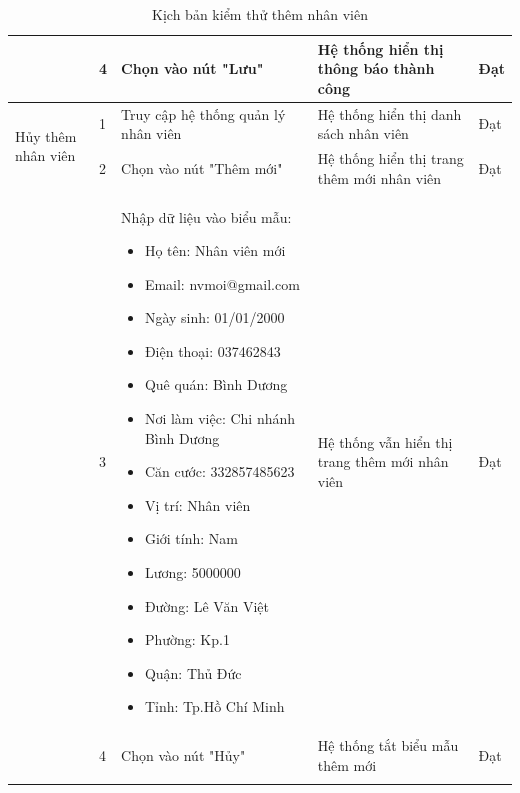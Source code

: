 {\begin{longtable}{| p{2.5cm}| p{1cm}| p{5.5cm}| p{4.5cm} | p{1.5cm} |}
        \cline{2-5}
                                                   & 4                                              & Chọn vào nút "Lưu"                  & Hệ thống hiển thị thông báo thành công        & Đạt             \\
        \hline
        \multirow[t]{2}{2.5cm}{Hủy thêm nhân viên} & 1                                              & Truy cập hệ thống quản lý nhân viên & Hệ thống hiển thị danh sách nhân viên         & Đạt             \\
        \cline{2-5}
                                                   & 2                                              & Chọn vào nút "Thêm mới"             & Hệ thống hiển thị trang thêm mới nhân viên    & Đạt             \\
        \cline{2-5}
                                                   & 3                                              & Nhập dữ liệu vào biểu mẫu:
        \begin{itemize}
            \item Họ tên: Nhân viên mới
            \item Email: nvmoi@gmail.com
            \item Ngày sinh: 01/01/2000
            \item Điện thoại: 037462843
            \item Quê quán: Bình Dương
            \item Nơi làm việc: Chi nhánh Bình Dương
            \item Căn cước: 332857485623
            \item Vị trí: Nhân viên
            \item Giới tính: Nam
            \item Lương: 5000000
            \item Đường: Lê Văn Việt
            \item Phường: Kp.1
            \item Quận: Thủ Đức
            \item Tỉnh: Tp.Hồ Chí Minh
        \end{itemize}   & Hệ thống vẫn hiển thị trang thêm mới nhân viên & Đạt                                                                                                                              \\
        \cline{2-5}
                                                   & 4                                              & Chọn vào nút "Hủy"                  & Hệ thống tắt biểu mẫu thêm mới                & Đạt             \\
        \hline
        \caption{Kịch bản kiểm thử thêm nhân viên}
    \end{longtable}
}


